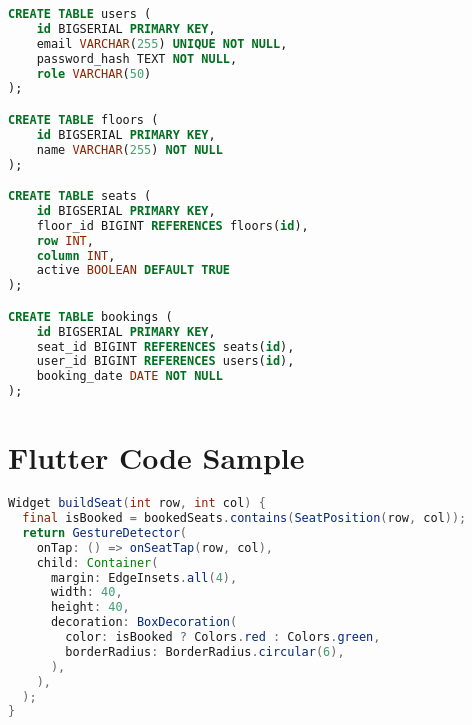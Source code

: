\documentclass[12pt,a4paper]{report}
\begin{document}
\begin{lstlisting}[language=SQL,caption=Table Definitions,label=lst:sql-schema]
CREATE TABLE users (
    id BIGSERIAL PRIMARY KEY,
    email VARCHAR(255) UNIQUE NOT NULL,
    password_hash TEXT NOT NULL,
    role VARCHAR(50)
);

CREATE TABLE floors (
    id BIGSERIAL PRIMARY KEY,
    name VARCHAR(255) NOT NULL
);

CREATE TABLE seats (
    id BIGSERIAL PRIMARY KEY,
    floor_id BIGINT REFERENCES floors(id),
    row INT,
    column INT,
    active BOOLEAN DEFAULT TRUE
);

CREATE TABLE bookings (
    id BIGSERIAL PRIMARY KEY,
    seat_id BIGINT REFERENCES seats(id),
    user_id BIGINT REFERENCES users(id),
    booking_date DATE NOT NULL
);
\end{lstlisting}

\chapter{Flutter Code Sample}
\label{appendix:flutter}

\begin{lstlisting}[language=Java,caption=Seat Booking Widget (Flutter),label=lst:flutter-ui]
Widget buildSeat(int row, int col) {
  final isBooked = bookedSeats.contains(SeatPosition(row, col));
  return GestureDetector(
    onTap: () => onSeatTap(row, col),
    child: Container(
      margin: EdgeInsets.all(4),
      width: 40,
      height: 40,
      decoration: BoxDecoration(
        color: isBooked ? Colors.red : Colors.green,
        borderRadius: BorderRadius.circular(6),
      ),
    ),
  );
}
\end{lstlisting}
\end{document}
